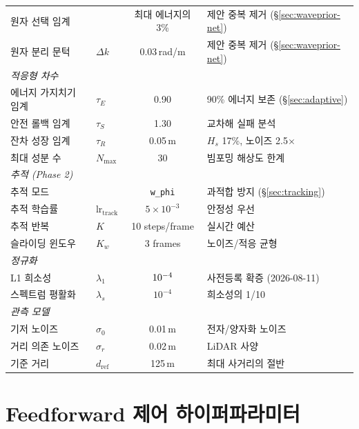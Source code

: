\documentclass[11pt]{report}
\numberwithin{equation}{chapter}
\numberwithin{figure}{chapter}
\numberwithin{table}{chapter}
\begin{document}
\begin{table}[htbp]
\begin{tabular}{llcp{4.8cm}}
원자 선택 임계 & & 최대 에너지의 3\% & 제안 중복 제거 (\S\ref{sec:waveprior-net}) \\
원자 분리 문턱 & $\Delta k$ & 0.03\,rad/m & 제안 중복 제거 (\S\ref{sec:waveprior-net}) \\
\midrule
\multicolumn{4}{l}{\textit{적응형 차수}} \\
에너지 가지치기 임계 & $\tau_E$ & 0.90 & 90\% 에너지 보존 (\S\ref{sec:adaptive}) \\
안전 롤백 임계 & $\tau_S$ & 1.30 & 교차해 실패 분석 \\
잔차 성장 임계 & $\tau_R$ & 0.05\,m & $H_s$ 17\%, 노이즈 2.5$\times$ \\
최대 성분 수 & $N_{\max}$ & 30 & 빔포밍 해상도 한계 \\
\midrule
\multicolumn{4}{l}{\textit{추적 (Phase 2)}} \\
추적 모드 & & \texttt{w\_phi} & 과적합 방지 (\S\ref{sec:tracking}) \\
추적 학습률 & $\text{lr}_{\text{track}}$ & $5\times10^{-3}$ & 안정성 우선 \\
추적 반복 & $K$ & 10 steps/frame & 실시간 예산 \\
슬라이딩 윈도우 & $K_w$ & 3 frames & 노이즈/적응 균형 \\
\midrule
\multicolumn{4}{l}{\textit{정규화}} \\
L1 희소성 & $\lambda_1$ & $10^{-4}$ & 사전등록 확증 (2026-08-11) \\
스펙트럼 평활화 & $\lambda_s$ & $10^{-4}$ & 희소성의 1/10 \\
\midrule
\multicolumn{4}{l}{\textit{관측 모델}} \\
기저 노이즈 & $\sigma_0$ & 0.01\,m & 전자/양자화 노이즈 \\
거리 의존 노이즈 & $\sigma_r$ & 0.02\,m & LiDAR 사양 \\
기준 거리 & $d_{\text{ref}}$ & 125\,m & 최대 사거리의 절반 \\
\bottomrule
\end{tabular}
\end{table}

\section{Feedforward 제어 하이퍼파라미터}
\end{document}
